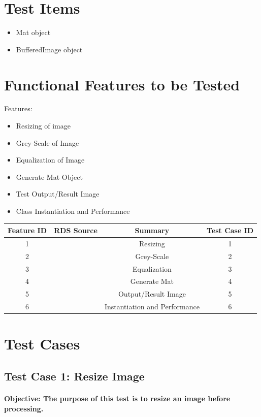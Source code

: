 \documentclass[a4paper,12pt]{report}
\begin{document}
\section {Test Items}		
	\begin{itemize}
		\item Mat object
		\item BufferedImage object 
	\end{itemize}

\section {Functional Features to be Tested}
	Features:
	\begin{itemize}
		\item Resizing of image
		\item Grey-Scale of Image
		\item Equalization of Image
		\item Generate Mat Object
		\item Test Output/Result Image
		\item Class Instantiation and Performance		
	\end{itemize}
	\FloatBarrier
	\begin{table}
		\centering
		\begin{tabular}{c c c c}
			\hline\hline
			Feature ID & RDS Source & Summary & Test Case ID \\[1ex]
			\hline
			1 &  & Resizing & 1 \\
			2 &  & Grey-Scale & 2\\
			3 &  & Equalization & 3\\
			4 &  & Generate Mat & 4\\
			5 &  & Output/Result Image & 5\\
			6 &  & Instantiation and Performance & 6\\
		\end{tabular}
	\end{table}
\newpage
\section{Test Cases}
	\subsection{Test Case 1: Resize Image}
	\paragraph{Objective: The purpose of this test is to resize an image before processing.}
\end{document}
